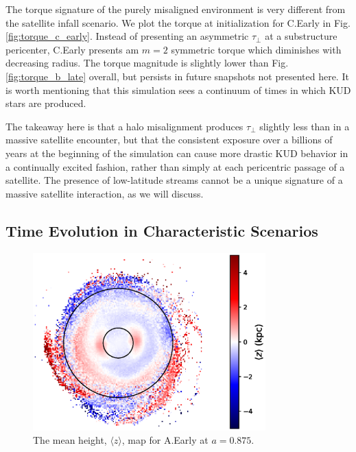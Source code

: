 The torque signature of the purely misaligned environment is very different from the satellite infall scenario. We plot the torque at initialization for C.Early in Fig. \ref{fig:torque_c_early}. Instead of presenting an asymmetric $\tau_\perp$ at a substructure pericenter, C.Early presents am $m=2$ symmetric torque which diminishes with decreasing radius. The torque magnitude is slightly lower than Fig. \ref{fig:torque_b_late} overall, but persists in future snapshots not presented here. It is worth mentioning that this simulation sees a continuum of times in which KUD stars are produced.

The takeaway here is that a halo misalignment produces $\tau_\perp$ slightly less than in a massive satellite encounter, but that the consistent exposure over a billions of years at the beginning of the simulation can cause more drastic KUD behavior in a continually excited fashion, rather than simply at each pericentric passage of a satellite. The presence of low-latitude streams cannot be a unique signature of a massive satellite interaction, as we will discuss.
 
\subsection{Time Evolution in Characteristic Scenarios} \label{ssec:mean_height}
\begin{figure}
	\centering
	\includegraphics[width=0.8\textwidth]{../figures/a_early_displacement_a_0_875.eps}
	\caption{The mean height, $\langle z \rangle$, map for A.Early at $a=0.875$.}\label{fig:a_early_displacement}
\end{figure}








